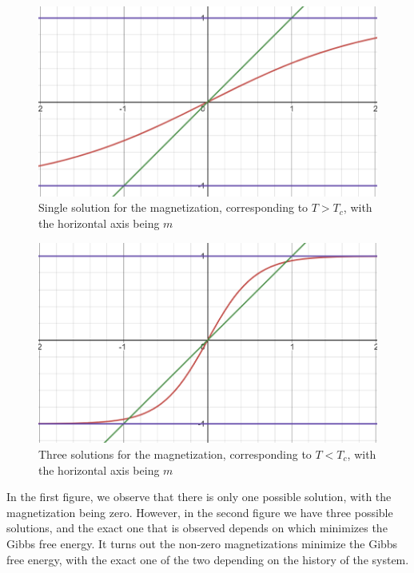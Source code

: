 \documentclass[12pt, a4paper, oneside, openright, titlepage]{book}
\begin{document}
\begin{figure}[H]
    \centering
    \includegraphics[scale = 0.8]{Images/OneSolution.PNG}
    \caption{Single solution for the magnetization, corresponding to $T > T_c$, with the horizontal axis being $m$}
    \label{fig:1sol}
\end{figure}

\begin{figure}[H]
    \centering
    \includegraphics[scale = 0.8]{Images/ThreeSolutions.PNG}
    \caption{Three solutions for the magnetization, corresponding to $T < T_c$, with the horizontal axis being $m$}
    \label{fig:3sol}
\end{figure}

In the first figure, we observe that there is only one possible solution, with the magnetization being zero. However, in the second figure we have three possible solutions, and the exact one that is observed depends on which minimizes the Gibbs free energy. It turns out the non-zero magnetizations minimize the Gibbs free energy, with the exact one of the two depending on the history of the system.
\end{document}
